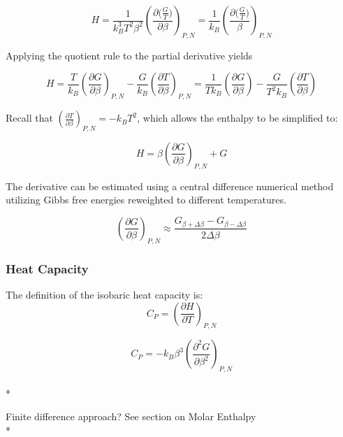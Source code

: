 \documentclass[a4paper,12pt]{article}
\begin{document}
\begin{equation}H = \frac{1}{k_B^3 T^2 \beta^2} \left(\frac{\partial \big(\frac{G}{T}\big)}{\partial \beta}\right)_{P,N} = \frac{1}{k_B} \left(\frac{\partial \big(\frac{G}{T}\big)}{\beta}\right)_{P,N}\end{equation}


\noindent Applying the quotient rule to the partial derivative yields


\begin{equation}H = \frac{T}{k_B} \left(\frac{\partial G}{\partial \beta}\right)_{P, N} - \frac{G}{k_B}\left(\frac{\partial T}{\partial \beta}\right)_{P, N} = \frac{1}{T k_B} \left(\frac{\partial G}{\partial \beta}\right) - \frac{G}{T^2 k_B} \left(\frac{\partial T}{\partial \beta}\right)\end{equation}


\noindent Recall that $\left(\frac{\partial T}{\partial \beta}\right)_{P, N} = -k_B T^2$, which allows the enthalpy to be simplified to:


\begin{equation} H = \beta \left(\frac{\partial G}{\partial \beta}\right)_{P, N} + G\end{equation}


\noindent The derivative can be estimated using a central difference numerical method utilizing Gibbs free energies reweighted to different temperatures.

\begin{equation} \left( \frac{\partial G}{\partial \beta} \right)_{P,N} \approx \frac{G_{\beta + \Delta \beta} - G_{\beta -\Delta \beta}}{2\Delta \beta} \end{equation}

\subsubsection{Heat Capacity}
\noindent The definition of the isobaric heat capacity is:
\begin{equation}C_P =\left( \frac{\partial H}{\partial T}\right)_{P,N}\end{equation}

\begin{equation}C_P =  -k_B \beta^3 \left(\frac{\partial^2 G}{\partial \beta^2}\right)_{P,N}\end{equation}\\*


\noindent Finite difference approach? See section on Molar Enthalpy\\*
\end{document}
